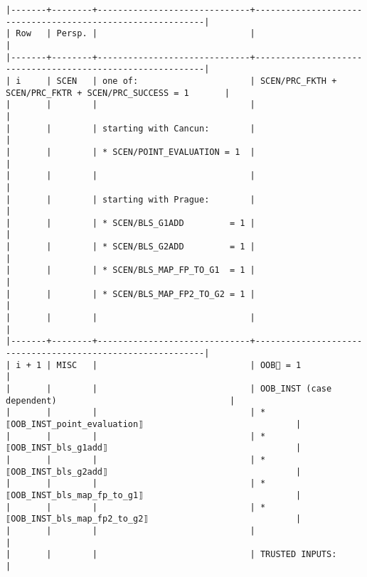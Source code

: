 \documentclass[varwidth=\maxdimen,margin=0.5cm,multi={verbatim}]{standalone}
\begin{document}
\begin{verbatim}
|-------+--------+------------------------------+------------------------------------------------------------|
| Row   | Persp. |                              |                                                            |
|-------+--------+------------------------------+------------------------------------------------------------|
| i     | SCEN   | one of:                      | SCEN/PRC_FKTH + SCEN/PRC_FKTR + SCEN/PRC_SUCCESS = 1       |
|       |        |                              |                                                            |
|       |        | starting with Cancun:        |                                                            |
|       |        | * SCEN/POINT_EVALUATION = 1  |                                                            |
|       |        |                              |                                                            |
|       |        | starting with Prague:        |                                                            |
|       |        | * SCEN/BLS_G1ADD         = 1 |                                                            |
|       |        | * SCEN/BLS_G2ADD         = 1 |                                                            |
|       |        | * SCEN/BLS_MAP_FP_TO_G1  = 1 |                                                            |
|       |        | * SCEN/BLS_MAP_FP2_TO_G2 = 1 |                                                            |
|       |        |                              |                                                            |
|-------+--------+------------------------------+------------------------------------------------------------|
| i + 1 | MISC   |                              | OOB🏴 = 1                                                  |
|       |        |                              | OOB_INST (case dependent)                                  |
|       |        |                              | * ⟦OOB_INST_point_evaluation⟧                              |
|       |        |                              | * ⟦OOB_INST_bls_g1add⟧                                     |
|       |        |                              | * ⟦OOB_INST_bls_g2add⟧                                     |
|       |        |                              | * ⟦OOB_INST_bls_map_fp_to_g1⟧                              |
|       |        |                              | * ⟦OOB_INST_bls_map_fp2_to_g2⟧                             |
|       |        |                              |                                                            |
|       |        |                              | TRUSTED INPUTS:                                            |

\end{verbatim}
\end{document}

